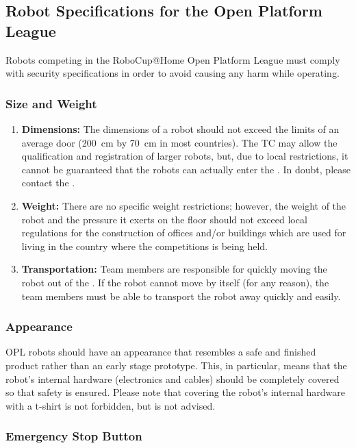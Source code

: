 \subsection{Robot Specifications for the Open Platform League}
Robots competing in the RoboCup@Home Open Platform League must comply with security specifications in order to avoid causing any harm while operating.

\subsubsection{Size and Weight}\label{rule:robots_size}

\begin{enumerate}
	\item \textbf{Dimensions:} The dimensions of a robot should not exceed the limits of an average door (\SI{200}{\centi\meter} by \SI{70}{\centi\meter} in most countries).
	The TC may allow the qualification and registration of larger robots, but, due to local restrictions, it cannot be guaranteed that the robots can actually enter the \Arena{}.
	In doubt, please contact the \LOC{}.
	\item \textbf{Weight:} There are no specific weight restrictions; however, the weight of the robot and the pressure it exerts on the floor should not exceed local regulations for the construction of offices and/or buildings which are used for living in the country where the competitions is being held.
	\item \textbf{Transportation:} Team members are responsible for quickly moving the robot out of the \Arena.
	If the robot cannot move by itself (for any reason), the team members must be able to transport the robot away quickly and easily.
\end{enumerate}

\subsubsection{Appearance}
\label{rule:robots_appearance}

OPL robots should have an appearance that resembles a safe and finished product rather than an early stage prototype.
This, in particular, means that the robot's internal hardware (electronics and cables) should be completely covered so that safety is ensured.
Please note that covering the robot's internal hardware with a t-shirt is not forbidden, but is not advised.

\subsubsection{Emergency Stop Button}
\label{rule:robots_emergency_button}

